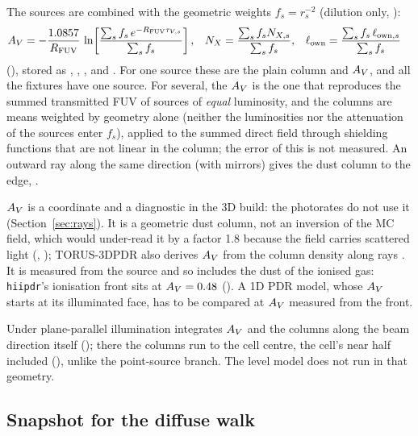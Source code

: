 The sources are combined with the geometric weights $f_s = r_s^{-2}$
(dilution only, ):
\begin{align}
  A_{V} &= -\frac{1.0857}{R_{\mathrm{FUV}}}\,\ln\!\left[\frac{\sum_s f_s\, e^{-R_{\mathrm{FUV}}\tau_{V,s}}}{\sum_s f_s}\right],
  &
  N_X &= \frac{\sum_s f_s N_{X,s}}{\sum_s f_s},
  &
  \ell_{\mathrm{own}} &= \frac{\sum_s f_s\,\ell_{\mathrm{own},s}}{\sum_s f_s}
  \label{eq:avradial}
\end{align}
(), stored as , , ,
 and . For one source these are the plain
column and $A_{V}$, and all the fixtures have one source. For several, the $A_{V}$
is the one that reproduces the summed transmitted FUV of sources of
\emph{equal} luminosity, and the columns are means weighted by geometry alone
(neither the luminosities nor the attenuation of the sources enter $f_s$),
applied to the summed direct field through shielding functions that are not
linear in the column; the error of this is not measured. An outward ray along
the same direction (with mirrors) gives the dust column to the edge,
.

$A_{V}$ is a coordinate and a diagnostic in the 3D build: the photorates do not
use it (Section~\ref{sec:rays}). It is a geometric dust column, not an
inversion of the MC field, which would under-read it by a factor 1.8 because
the field carries scattered light (, ); TORUS-3DPDR also
derives $A_{V}$ from the column density along rays \citep[their Eq.~2]{Bisbas2015}.
It is measured from the source and so includes the dust of the ionised gas:
\texttt{hiipdr}'s ionisation front sits at $A_{V}=0.48$ (). A 1D PDR
model, whose $A_{V}$ starts at its illuminated face, has to be compared at
$A_{V}$ measured from the front.

Under plane-parallel illumination  integrates $A_{V}$ and the
columns along the beam direction itself (); there the
columns run to the cell centre, the cell's near half included
(), unlike the point-source branch. The level model does
not run in that geometry.

\subsection{Snapshot for the diffuse walk}

